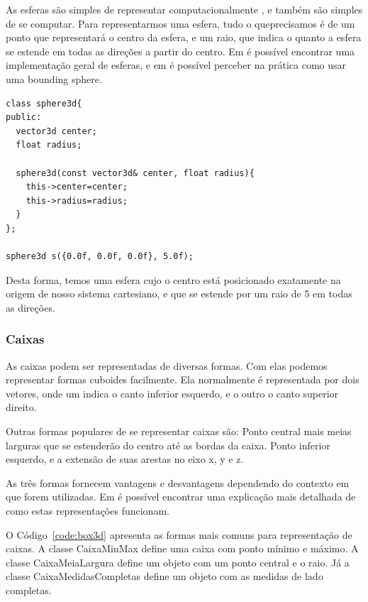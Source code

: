As esferas são simples de representar computacionalmente , e também são simples de se computar.
Para representarmos uma esfera, tudo o queprecisamos é de um ponto que representará o centro da esfera, e um raio, que
indica o quanto a esfera se estende em todas as direções a partir do centro.
Em  é possível encontrar uma implementação geral de esferas, e em  é possível perceber na prática como usar uma bounding sphere.

\begin{lstlisting}[frame=single,caption=Representação de esfera\label{code:sphere3d}]
class sphere3d{
public:
  vector3d center;
  float radius;
  
  sphere3d(const vector3d& center, float radius){
    this->center=center;
    this->radius=radius;
  }
};

sphere3d s({0.0f, 0.0f, 0.0f}, 5.0f);

\end{lstlisting}

Desta forma, temos uma esfera cujo o centro está posicionado exatamente na origem de
nosso sistema cartesiano, e que se estende por um raio de 5 em todas as
direções.

\subsubsection{Caixas}

As caixas podem ser representadas de diversas formas. Com elas podemos
representar formas cuboides facilmente. Ela normalmente é representada por dois
vetores, onde um indica o canto inferior esquerdo, e o outro o canto superior direito.

Outras formas populares de se representar caixas são:
Ponto central mais meias larguras que se estenderão do centro até as bordas da caixa.
Ponto inferior esquerdo, e a extensão de suas arestas no eixo x, y e z.

As três formas fornecem vantagens e desvantagens dependendo do contexto em que forem utilizadas. Em  é possível encontrar uma explicação mais detalhada de como estas representações funcionam.


O Código~\ref{code:box3d} apresenta as formas mais comuns para representação de caixas. A classe CaixaMinMax define uma caixa com ponto mínimo e máximo. A classe CaixaMeiaLargura define um objeto com um ponto central e o raio. Já a classe CaixaMedidasCompletas define um objeto com as medidas de lado completas.

